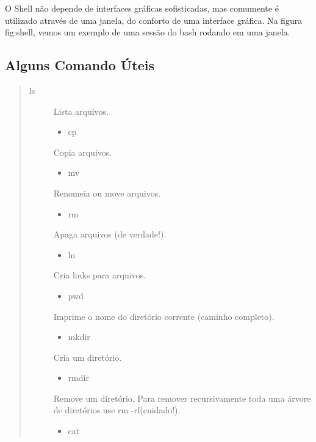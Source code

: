 \documentclass[a4paper,10pt,portuguese]{sphinxmanual}
\begin{document}
O Shell não depende de interfaces gráficas sofisticadas, mas
comumente é utilizado através de uma janela, do conforto de uma
interface gráfica. Na figura fig:shell, vemos um exemplo de uma
sessão do bash rodando em uma janela.


\subsection{Alguns Comando Úteis}
\label{bash:alguns-comando-uteis}\begin{quote}
\begin{description}
\item[{ls}] \leavevmode
Lista arquivos.
\begin{itemize}
\item {} 
cp

\end{itemize}

Copia arquivos.
\begin{itemize}
\item {} 
mv

\end{itemize}

Renomeia ou move arquivos.
\begin{itemize}
\item {} 
rm

\end{itemize}

Apaga arquivos (de verdade!).
\begin{itemize}
\item {} 
ln

\end{itemize}

Cria links para arquivos.
\begin{itemize}
\item {} 
pwd

\end{itemize}

Imprime o nome do diretório corrente (caminho completo).
\begin{itemize}
\item {} 
mkdir

\end{itemize}

Cria um diretório.
\begin{itemize}
\item {} 
rmdir

\end{itemize}

Remove um diretório. Para remover recursivamente toda uma
árvore de diretórios use rm -rf(cuidado!).
\begin{itemize}
\item {} 
cat


\end{itemize}
\end{description}
\end{quote}
\end{document}
